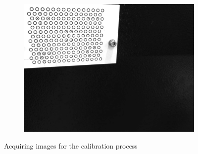 \begin{figure}[h]
\begin{subfigure}{0.32\textwidth}
        \includegraphics[width=\textwidth]{figures/001calibration/calibration8.PNG}
    \end{subfigure}

    \caption{Acquiring images for the calibration process}
    \label{fig:calibration-steps}
\end{figure}

